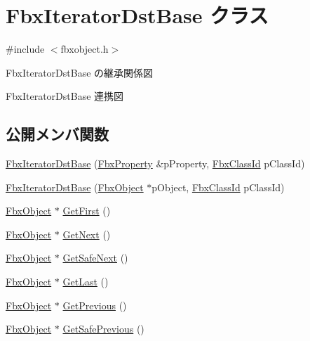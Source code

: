 \hypertarget{class_fbx_iterator_dst_base}{}\section{Fbx\+Iterator\+Dst\+Base クラス}
\label{class_fbx_iterator_dst_base}


{\ttfamily \#include $<$fbxobject.\+h$>$}



Fbx\+Iterator\+Dst\+Base の継承関係図


Fbx\+Iterator\+Dst\+Base 連携図
\subsection*{公開メンバ関数}
\begin{DoxyCompactItemize}
\item 
\hyperlink{class_fbx_iterator_dst_base_ab8ebd364825476724f9db0ca76bf6f9b}{Fbx\+Iterator\+Dst\+Base} (\hyperlink{class_fbx_property}{Fbx\+Property} \&p\+Property, \hyperlink{class_fbx_class_id}{Fbx\+Class\+Id} p\+Class\+Id)
\item 
\hyperlink{class_fbx_iterator_dst_base_a28644eed9f037cf94d81dbf7c733622e}{Fbx\+Iterator\+Dst\+Base} (\hyperlink{class_fbx_object}{Fbx\+Object} $\ast$p\+Object, \hyperlink{class_fbx_class_id}{Fbx\+Class\+Id} p\+Class\+Id)
\item 
\hyperlink{class_fbx_object}{Fbx\+Object} $\ast$ \hyperlink{class_fbx_iterator_dst_base_a52413f0e25a78503bbd1add8a30fec80}{Get\+First} ()
\item 
\hyperlink{class_fbx_object}{Fbx\+Object} $\ast$ \hyperlink{class_fbx_iterator_dst_base_ae7b2570f972d09f8e12b2dc22033c90e}{Get\+Next} ()
\item 
\hyperlink{class_fbx_object}{Fbx\+Object} $\ast$ \hyperlink{class_fbx_iterator_dst_base_a2107573dd3869f094ca35931ffc4b790}{Get\+Safe\+Next} ()
\item 
\hyperlink{class_fbx_object}{Fbx\+Object} $\ast$ \hyperlink{class_fbx_iterator_dst_base_a36f14606800603afb3106369d8dec485}{Get\+Last} ()
\item 
\hyperlink{class_fbx_object}{Fbx\+Object} $\ast$ \hyperlink{class_fbx_iterator_dst_base_aa722d332048283c09ba3e690bfe52e14}{Get\+Previous} ()
\item 
\hyperlink{class_fbx_object}{Fbx\+Object} $\ast$ \hyperlink{class_fbx_iterator_dst_base_af5526eefa90ef43e1a0daff1b8e8e3d3}{Get\+Safe\+Previous} ()
\end{DoxyCompactItemize}
